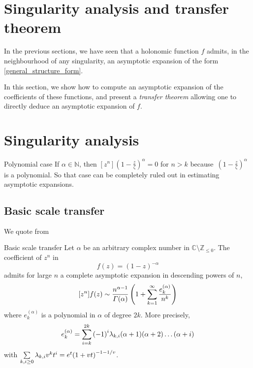 \documentclass[../main.tex]{subfiles}
\begin{document}
\section{Singularity analysis and transfer theorem}

In the previous sections, we have seen that a holonomic function $f$ admits, in the neighbourhood of any singularity, an asymptotic expansion of the form \eqref{general_structure_form}.

In this section, we show how to compute an asymptotic expansion of the coefficients of these functions, and present a \emph{transfer theorem} allowing one to directly deduce an asymptotic expansion of $f$.

\section{Singularity analysis}

\begin{thm}{Polynomial case}
	If $\alpha \in \mathbb{N}$, then $[z^n]{\left(1 - \frac{z}{\zeta}\right)}^\alpha = 0$ for $n > k$
	because~${\left(1 - \frac{z}{\zeta}\right)}^\alpha$ is a polynomial. So that case can be completely ruled out in estimating asymptotic expansions.
\end{thm}


\subsection{Basic scale transfer}

We quote from \cite{Flajolet2009}

\begin{thm}{Basic scale transfer}
	Let $\alpha$ be an arbitrary complex number in
	$\mathbb{C} \setminus \mathbb{Z}_{\leq 0}$.
	The coefficient of $z^n$ in
	\[
	f(z) = {(1 - z)}^{-\alpha}
	\]
	admits for large $n$ a complete asymptotic expansion in descending powers of $n$,
	\[
	[z^n]f(z) \sim \frac{n^{\alpha - 1}}{\Gamma(\alpha)}
	\left(1 + \sum\limits_{k = 1}^{\infty} \frac{e_k^{(\alpha)}}{n^k} \right)
	\]
	where $e_k^{(\alpha)}$ is a polynomial in $\alpha$ of degree $2k$.
	More precisely,
	\[
	e_k^{(\alpha)} = \sum\limits_{i = k}^{2k} {(-1)}^i \lambda_{k, i} (\alpha + 1) (\alpha + 2) \dots (\alpha + i)
	\]
	with $\sum\limits_{k, i \geq 0} \lambda_{k, i} v^k t^i = e^t {(1 + vt)}^{-1 - 1/v}$.
\end{thm}
\end{document}
